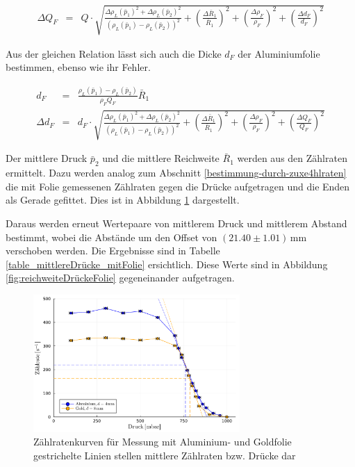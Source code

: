 \documentclass[12pt,a4paper]{scrartcl}
\numberwithin{equation}{section} %
\begin{document}
\begin{eqnarray}
	\Delta Q_F &=& Q \cdot \sqrt{\frac{{\Delta \rho_L(\bar{p}_1)}^2 + {\Delta \rho_L(\bar{p}_2)}^2}{\left(\rho_L(\bar{p}_1) - \rho_L(\bar{p}_2)\right)^2} + \left(\frac{\Delta \bar{R}_1}{\bar{R}_1}\right)^2 + \left(\frac{\Delta \rho_F}{\rho_F}\right)^2 + \left(\frac{\Delta d_F}{d_F}\right)^2}
\label{eq:fehler_Q_F}
\end{eqnarray}

\noindent
Aus der gleichen Relation lässt sich auch die Dicke $d_F$ der Aluminiumfolie bestimmen, ebenso wie ihr Fehler.

\begin{eqnarray}
	d_F &=& \frac{\rho_L(\bar{p}_1) - \rho_L(\bar{p}_2)}{\rho_F Q_F} \bar{R}_1 \label{eq:d_F} \\
	\Delta d_F &=& d_F \cdot
		\sqrt{\frac{{\Delta \rho_L(\bar{p}_1)}^2 + {\Delta \rho_L(\bar{p}_2)}^2}{\left(\rho_L(\bar{p}_1) - \rho_L(\bar{p}_2)\right)^2} + \left(\frac{\Delta \bar{R}_1}{\bar{R}_1}\right)^2 + \left(\frac{\Delta \rho_F}{\rho_F}\right)^2 + \left(\frac{\Delta Q_F}{Q_F}\right)^2}
	\label{eq:fehler_d_F}
\end{eqnarray}

\noindent
Der mittlere Druck $\bar{p}_2$ und die mittlere Reichweite $\bar{R}_1$ werden aus den Zählraten ermittelt. Dazu werden analog zum Abschnitt \ref{bestimmung-durch-zuxe4hlraten} die mit Folie gemessenen Zählraten gegen die Drücke aufgetragen und die Enden als Gerade  gefittet. Dies ist in Abbildung \ref{fig:zählraten mit folien} dargestellt.

Daraus werden erneut Wertepaare von mittlerem Druck und mittlerem Abstand bestimmt, wobei die Abstände um den Offset von $(21.40 \pm 1.01) \mathrm{\, mm}$ verschoben werden. Die Ergebnisse sind in Tabelle \ref{table_mittlereDrücke_mitFolie} ersichtlich. Diese Werte sind in Abbildung \ref{fig:reichweiteDrückeFolie} gegeneinander aufgetragen.

\begin{figure}[H]
	\centering
	\includegraphics[width=0.7\textwidth]{../media/B3.3/zaehlraten.pdf}
	\caption{Zählratenkurven für Messung mit Aluminium- und Goldfolie \\
			gestrichelte Linien stellen mittlere Zählraten bzw. Drücke dar}
	\label{fig:zählraten mit folien}
\end{figure}
\end{document}
